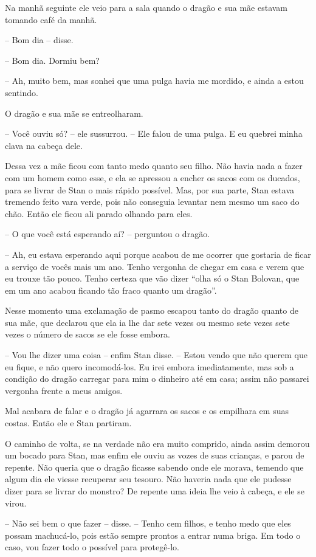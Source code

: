 Na manhã seguinte ele veio para a sala quando o dragão e sua mãe
estavam tomando café da manhã.

-- Bom dia -- disse.

-- Bom dia. Dormiu bem?

-- Ah, muito bem, mas sonhei que uma pulga havia me mordido, e ainda a
estou sentindo.

O dragão e sua mãe se entreolharam.

-- Você ouviu só? -- ele sussurrou. -- Ele falou de uma pulga. E eu
quebrei minha clava na cabeça dele.

Dessa vez a mãe ficou com tanto medo quanto seu filho. Não havia nada
a fazer com um homem como esse, e ela se apressou a encher os sacos
com os ducados, para se livrar de Stan o mais rápido possível. Mas,
por sua parte, Stan estava tremendo feito vara verde, pois não
conseguia levantar nem mesmo um saco do chão. Então ele ficou ali
parado olhando para eles.

-- O que você está esperando aí? -- perguntou o dragão.

-- Ah, eu estava esperando aqui porque acabou de me ocorrer que
gostaria de ficar a serviço de vocês mais um ano. Tenho vergonha de
chegar em casa e verem que eu trouxe tão pouco. Tenho certeza que vão
dizer “olha só o Stan Bolovan, que em um ano acabou ficando tão fraco
quanto um dragão”.

Nesse momento uma exclamação de pasmo escapou tanto do dragão quanto
de sua mãe, que declarou que ela ia lhe dar sete vezes ou mesmo sete
vezes sete vezes o número de sacos se ele fosse embora.

-- Vou lhe dizer uma coisa -- enfim Stan disse. -- Estou vendo que não
querem que eu fique, e não quero incomodá-los. Eu irei embora
imediatamente, mas sob a condição do dragão carregar para mim o
dinheiro até em casa; assim não passarei vergonha frente a meus
amigos.

Mal acabara de falar e o dragão já agarrara os sacos e os empilhara em
suas costas. Então ele e Stan partiram.

O caminho de volta, se na verdade não era muito comprido, ainda assim
demorou um bocado para Stan, mas enfim ele ouviu as vozes de suas
crianças, e parou de repente. Não queria que o dragão ficasse sabendo
onde ele morava, temendo que algum dia ele viesse recuperar seu
tesouro. Não haveria nada que ele pudesse dizer para se livrar do
monstro? De repente uma ideia lhe veio à cabeça, e ele se virou.

-- Não sei bem o que fazer -- disse. -- Tenho cem filhos, e tenho medo
que eles possam machucá-lo, pois estão sempre prontos a entrar numa
briga. Em todo o caso, vou fazer todo o possível para protegê-lo.

